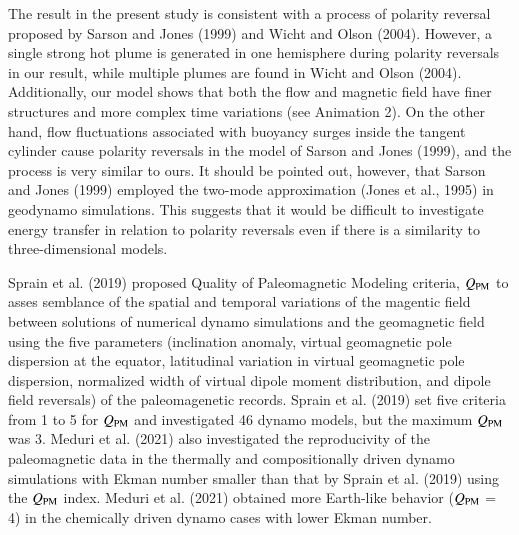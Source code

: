 The result in the present study is consistent with a process of polarity reversal proposed by Sarson and Jones (1999) and Wicht and Olson (2004).
However, a single strong hot plume is generated in one hemisphere during polarity reversals in our result, while multiple plumes are found in Wicht and Olson (2004).
Additionally, our model shows that both the flow and magnetic field have finer structures and more complex time variations (see Animation 2).
On the other hand, flow fluctuations associated with buoyancy surges inside the tangent cylinder cause polarity reversals in the model of Sarson and Jones (1999), and the process is very similar to ours.
It should be pointed out, however, that Sarson and Jones (1999) employed the two-mode approximation (Jones et al., 1995) in geodynamo simulations.
This suggests that it would be difficult to investigate energy transfer in relation to polarity reversals even if there is a similarity to three-dimensional models.


Sprain et al. (2019) proposed Quality of Paleomagnetic Modeling criteria, $Q_{\rm PM}$ to asses semblance of the spatial and temporal variations of the magentic field between solutions of numerical dynamo simulations and the geomagnetic field using the five parameters (inclination anomaly, virtual geomagnetic pole dispersion at the equator, latitudinal variation in virtual geomagnetic pole dispersion, normalized width of virtual dipole moment distribution, and dipole field reversals) of the paleomagenetic records. Sprain et al. (2019) set five criteria from 1 to 5 for $Q_{\rm PM}$ and investigated 46 dynamo models, but the maximum $Q_{\rm PM}$ was 3. Meduri et al. (2021) also investigated the reproducivity of the paleomagnetic data in the thermally and compositionally driven dynamo simulations with Ekman number smaller than that by Sprain et al. (2019) using the $Q_{\rm PM}$ index. Meduri et al. (2021) obtained more Earth-like behavior ($Q_{\rm PM}$ = 4) in the chemically driven dynamo cases with lower Ekman number.

